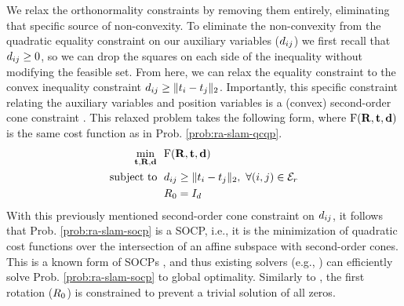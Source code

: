 We relax the orthonormality constraints by removing them entirely, eliminating
that specific source of non-convexity. To eliminate the non-convexity from the
quadratic equality constraint on our auxiliary variables ($d_{ij}$) we first
recall that $d_{ij} \geq 0$, so we can drop the squares on each side of the
inequality without modifying the feasible set. From here, we can relax the
equality constraint to the convex inequality constraint $ d_{ij} \geq \lVert
    t_i - t_j \rVert_2$. Importantly, this specific constraint relating the
auxiliary variables and position variables is a (convex) second-order cone
constraint \cite{boyd04book,alizadeh03mathematicalprogramming}. This relaxed
problem takes the following form, where $\text{F} (\bf R, \bf t, \bf d)$ is the same cost
function as in Prob. \ref{prob:ra-slam-qcqp}.
\begin{equation}
    \label{prob:ra-slam-socp}
    \begin{aligned}
         \min\limits_{\bf t, \bf R, \bf d} ~~ & \text{F} (\bf R, \bf t, \bf d) \\
         \textnormal{subject to\; } & d_{ij} \geq \lVert t_i - t_j \rVert_2,~\forall (i,j) \in \mathcal{E}_{r} \\
          & R_0 = I_d
    \end{aligned}
\end{equation}
With this previously mentioned second-order cone constraint on $d_{ij}$, it follows that
Prob. \ref{prob:ra-slam-socp} is a SOCP, i.e., it is the minimization of quadratic cost
functions over the intersection of an affine subspace with second-order
cones. This is a known form of SOCPs \cite{alizadeh03mathematicalprogramming},
and thus existing solvers (e.g., \cite{gurobi}) can efficiently solve
Prob. \ref{prob:ra-slam-socp} to global optimality. Similarly to \cite{martinec07cvpr},
the first rotation ($R_0$) is constrained to prevent a trivial solution of
all zeros.
